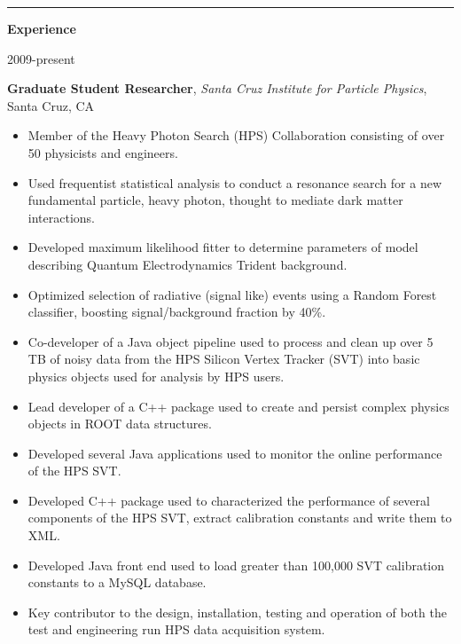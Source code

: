 \documentclass[10pt]{article}
\newcommand{\resumesection}[1] {
    \noindent
    \textcolor{indigodye}{\rule{.15\textwidth}{.1in} \hspace{0.01 \textwidth} \textbf{\Large{#1}}} \newline
}
\newcommand{\experienceentry}[5] { 
    \noindent
    \begin{minipage}[t]{0.15\textwidth} \begin{flushright} #1 \end{flushright} \end{minipage} \hspace{0.01\textwidth}
    \begin{minipage}[t]{0.84\textwidth} 
        \textbf{#2}, \emph{#3}, #4 
        #5
    \end{minipage}
}
\begin{document}
    \resumesection{Experience}
        \experienceentry{2009-present}
                        {Graduate Student Researcher}
                        {Santa Cruz Institute for Particle Physics}
                        {Santa Cruz, CA}
                        {
                            \begin{itemize}[label=\textcolor{indigodye}{$\circ$}, noitemsep, nolistsep, leftmargin=*]
                              \item Member of the Heavy Photon Search (HPS) Collaboration consisting of over 50 
                                    physicists and engineers.
                              \item Used frequentist statistical analysis to conduct a resonance search for a new
                                    fundamental particle, heavy photon, thought to mediate dark matter 
                                    interactions.
                              \item Developed maximum likelihood fitter to determine parameters of model describing 
                                    Quantum Electrodynamics Trident background.
                              \item Optimized selection of radiative (signal like) events using a Random Forest 
                                    classifier, boosting signal/background fraction by 40\%.
                              \item Co-developer of a Java object pipeline used to process and clean up
                                    over 5 TB of noisy data from the HPS Silicon Vertex Tracker (SVT) into basic
                                    physics objects used for analysis by HPS users.
                              \item Lead developer of a C++ package used to create and persist complex physics 
                                    objects in ROOT data structures.
                              \item Developed several Java applications used to monitor the online performance
                                    of the HPS SVT.
                              \item Developed C++ package used to characterized the performance of several components
                                    of the HPS SVT, extract calibration constants and write them to XML.
                              \item Developed Java front end used to load greater than 100,000 SVT calibration 
                                    constants to a MySQL database.  
                              \item Key contributor to the design, installation, testing and operation of both the 
                                    test and engineering run HPS data acquisition system.
                          \end{itemize}
                        }
\end{document}
